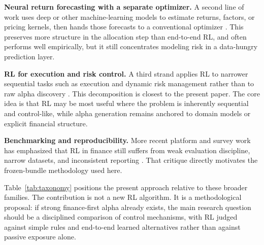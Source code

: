 \documentclass[10pt,twocolumn]{article}
\begin{document}
\textbf{Neural return forecasting with a separate optimizer.} A second line of
work uses deep or other machine-learning models to estimate returns, factors, or
pricing kernels, then hands those forecasts to a conventional optimizer
\cite{gu2020,chen2021,giglio2022}. This preserves more structure in the
allocation step than end-to-end RL, and often performs well empirically, but it
still concentrates modeling risk in a data-hungry prediction layer.

\textbf{RL for execution and risk control.} A third strand applies RL to
narrower sequential tasks such as execution and dynamic risk management rather
than to raw alpha discovery \cite{nevmyvaka2006,kolm2019hedge,buehler2019,du2020}.
This decomposition is closest to the present paper. The core idea is that RL
may be most useful where the problem is inherently sequential and control-like,
while alpha generation remains anchored to domain models or explicit financial
structure.

\textbf{Benchmarking and reproducibility.} More recent platform and survey work
has emphasized that RL in finance still suffers from weak evaluation discipline,
narrow datasets, and inconsistent reporting \cite{sun2023,jander2025}. That
critique directly motivates the frozen-bundle methodology used here.

Table~\ref{tab:taxonomy} positions the present approach relative to these
broader families. The contribution is not a new RL algorithm. It is a
methodological proposal: if strong finance-first alpha already exists, the main
research question should be a disciplined comparison of control mechanisms, with
RL judged against simple rules and end-to-end learned alternatives rather than
against passive exposure alone.
\end{document}
